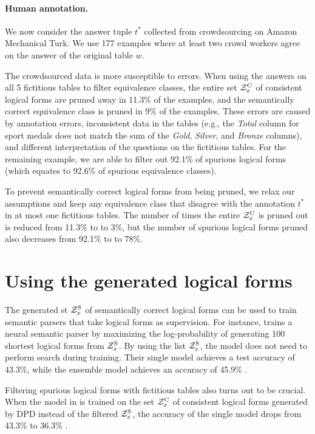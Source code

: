 \paragraph{Human annotation.}
We now consider the answer tuple $t^*$
collected from crowdsourcing on Amazon Mechanical Turk.
We use 177 examples where at least two crowd workers
agree on the answer of the original table $w$.

The crowdsourced data is more susceptible to errors.
When using the answers on all 5 fictitious tables
to filter equivalence classes,
the entire set $\mathcal{Z}^\mathrm{C}_x$ of consistent logical forms
are pruned away in 11.3\% of the examples,
and the semantically correct equivalence class is pruned
in 9\% of the examples.
These errors are caused by annotation errors,
inconsistent data in the tables
(e.g., the \emph{Total} column
for sport medals
does not match the sum of the
\emph{Gold}, \emph{Silver}, and \emph{Bronze}
columns),
and different interpretation of the questions
on the fictitious tables.
For the remaining example,
we are able to filter out 92.1\% 
of spurious logical forms (which equates to
92.6\% of spurious equivalence classes).

To prevent semantically correct logical forms
from being pruned,
we relax our assumptions and keep any equivalence class
that disagree with the annotation $t^*$
in at most one fictitious tables.
The number of times the entire $\mathcal{Z}^\mathrm{C}_x$
is pruned out is reduced from
11.3\% to to 3\%,
but the number of spurious logical forms pruned
also decreases from 92.1\% to to 78\%.

\section{Using the generated logical forms}
The generated st $\mathcal{Z}^\mathrm{S}_x$ of semantically correct logical forms
can be used to train semantic parsers
that take logical forms as supervision.
For instance, \cite{krishnamurthy2017neural}
trains a neural semantic parser
by maximizing the log-probability of generating
100 shortest logical forms from $\mathcal{Z}^\mathrm{S}_x$.
By using the list $\mathcal{Z}^\mathrm{S}_x$,
the model does not need to perform search
during training.
Their single model achieves a test accuracy of 43.3\%,
while the ensemble model achieves an accuracy of 45.9\% .

Filtering spurious logical forms with fictitious tables
also turns out to be crucial.
When the model in \citet{krishnamurthy2017neural}
is trained on the set $\mathcal{Z}^\mathrm{C}_x$ of consistent logical forms
generated by DPD instead of the filtered $\mathcal{Z}^\mathrm{S}_x$,
the accuracy of the single model drops from 43.3\% to 36.3\%
\cite{mudrakarta2018it}.

